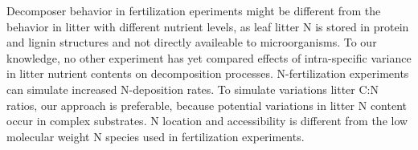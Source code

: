 \documentclass[authoryear,preprint,review,12pt]{elsarticle}
\begin{document}
Decomposer behavior in fertilization eperiments might be different from the behavior in litter with different nutrient levels, as leaf litter N is stored in protein and lignin structures and not directly availeable to microorganisms. To our knowledge, no other experiment has yet compared effects of intra-specific variance in litter nutrient contents on decomposition processes. N-fertilization experiments can simulate increased N-deposition rates. To simulate variations litter C:N ratios, our approach is preferable, because potential variations in litter N content occur in complex substrates. N location and accessibility is different from the low molecular weight N species used in fertilization experiments.




\end{document}
